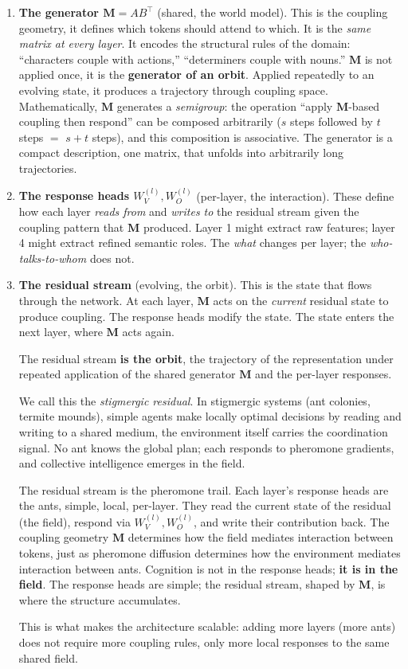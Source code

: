 \documentclass[11pt, a4paper]{article}
\newcommand{\M}{\mathbf{M}}
\theoremstyle{remark}
\begin{document}
\begin{enumerate}
    \item \textbf{The generator $\M = AB^\top$} (shared, the world model).
    This is the coupling geometry, it defines which tokens should attend to which.
    It is the \emph{same matrix at every layer}.
    It encodes the structural rules of the domain: ``characters couple with actions,''
    ``determiners couple with nouns.''
    $\M$ is not applied once, it is the \textbf{generator of an orbit}.
    Applied repeatedly to an evolving state, it produces a trajectory through coupling space.
    Mathematically, $\M$ generates a \emph{semigroup}: the operation ``apply $\M$-based coupling then respond'' can be composed arbitrarily ($s$ steps followed by $t$ steps $=$ $s{+}t$ steps), and this composition is associative.
    The generator is a compact description, one matrix, that unfolds into arbitrarily long trajectories.

    \item \textbf{The response heads $W_V^{(l)}, W_O^{(l)}$} (per-layer, the interaction).
    These define how each layer \emph{reads from} and \emph{writes to} the residual stream
    given the coupling pattern that $\M$ produced.
    Layer 1 might extract raw features; layer 4 might extract refined semantic roles.
    The \emph{what} changes per layer; the \emph{who-talks-to-whom} does not.

    \item \textbf{The residual stream} (evolving, the orbit).
    This is the state that flows through the network.
    At each layer, $\M$ acts on the \emph{current} residual state to produce coupling.
    The response heads modify the state.
    The state enters the next layer, where $\M$ acts again.

    The residual stream \textbf{is the orbit}, the trajectory of the representation
    under repeated application of the shared generator $\M$ and the per-layer responses.

    We call this the \emph{stigmergic residual}.
    In stigmergic systems (ant colonies, termite mounds), simple agents make locally optimal decisions by reading and writing to a shared medium, the environment itself carries the coordination signal.
    No ant knows the global plan; each responds to pheromone gradients, and collective intelligence emerges in the field.

    The residual stream is the pheromone trail.
    Each layer's response heads are the ants, simple, local, per-layer.
    They read the current state of the residual (the field), respond via $W_V^{(l)}, W_O^{(l)}$, and write their contribution back.
    The coupling geometry $\M$ determines how the field mediates interaction between tokens, just as pheromone diffusion determines how the environment mediates interaction between ants.
    Cognition is not in the response heads; \textbf{it is in the field}.
    The response heads are simple; the residual stream, shaped by $\M$, is where the structure accumulates.

    This is what makes the architecture scalable: adding more layers (more ants) does not require more coupling rules, only more local responses to the same shared field.
\end{enumerate}
\end{document}
